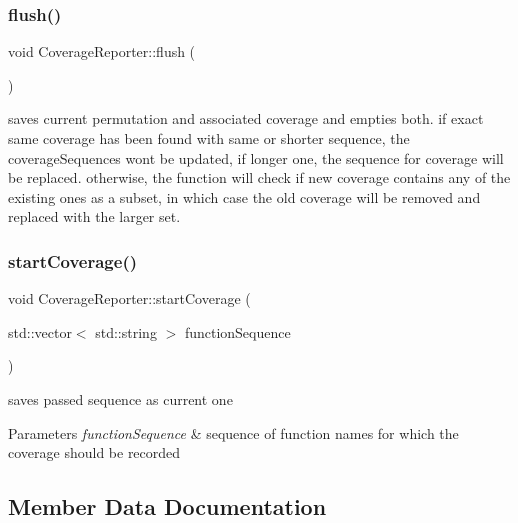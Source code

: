 \subsubsection{\texorpdfstring{flush()}{flush()}}
{\footnotesize\ttfamily void Coverage\+Reporter\+::flush (\begin{DoxyParamCaption}{ }\end{DoxyParamCaption})}

saves current permutation and associated coverage and empties both. if exact same coverage has been found with same or shorter sequence, the coverage\+Sequences won\textquotesingle{}t be updated, if longer one, the sequence for coverage will be replaced. otherwise, the function will check if new coverage contains any of the existing ones as a subset, in which case the old coverage will be removed and replaced with the larger set. \mbox{\label{classCoverageReporter_a560eff3e34be25d1a49c37ffd99e69c1}} 
\subsubsection{\texorpdfstring{start\+Coverage()}{startCoverage()}}
{\footnotesize\ttfamily void Coverage\+Reporter\+::start\+Coverage (\begin{DoxyParamCaption}\item[{std\+::vector$<$ std\+::string $>$}]{function\+Sequence }\end{DoxyParamCaption})}

saves passed sequence as current one 
\begin{DoxyParams}{Parameters}
{\em function\+Sequence} & sequence of function names for which the coverage should be recorded \\
\hline
\end{DoxyParams}


\subsection{Member Data Documentation}
\mbox{\label{classCoverageReporter_a395e6d59cc394e670fff1e8a575fc329}} 
